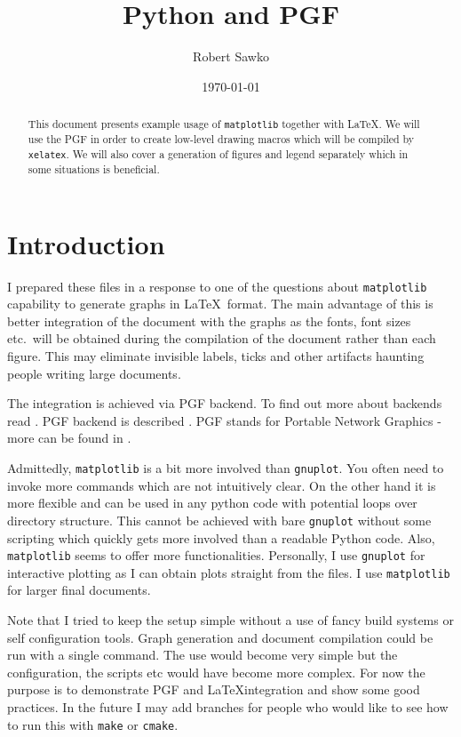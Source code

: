 \documentclass[a4paper,12pt]{article}
\date{\today}
\author{Robert Sawko}
\affil{Department of Engineering Computing, Cranfield University}
\title{Python and PGF}
\begin{document}
\maketitle

\begin{abstract}

  This document presents example usage of \texttt{matplotlib} together with
  \LaTeX. We will use the PGF in order to create low-level drawing macros which
  will be compiled by \texttt{xelatex}. We will also cover a generation of
  figures and legend separately which in some situations is beneficial.

\end{abstract}

\section{Introduction}

I prepared these files in a response to one of the questions about
\texttt{matplotlib} capability to generate graphs in \LaTeX\ format. The main
advantage of this is better integration of the document with the graphs as the
fonts, font sizes etc.\ will be obtained during the compilation of the document
rather than each figure. This may eliminate invisible labels, ticks and other
artifacts haunting people writing large documents.

The integration is achieved via PGF backend. To find out more about backends
read \cite{backend}. PGF backend is described \cite{pgf}. PGF stands for
Portable Network Graphics - more can be found in \cite{pgfwiki}.

Admittedly, \texttt{matplotlib} is a bit more involved than \texttt{gnuplot}.
You often need to invoke more commands which are not intuitively clear. On the
other hand it is more flexible and can be used in any python code with potential
loops over directory structure. This cannot be achieved with bare
\texttt{gnuplot} without some scripting which quickly gets more involved than a
readable Python code. Also, \texttt{matplotlib} seems to offer more
functionalities. Personally, I use \texttt{gnuplot} for interactive plotting as
I can obtain plots straight from the files. I use \texttt{matplotlib} for larger
final documents.

Note that I tried to keep the setup simple without a use of fancy build systems
or self configuration tools. Graph generation and document compilation could be
run with a single command. The use would become very simple but the
configuration, the scripts etc would have become more complex. For now the
purpose is to demonstrate PGF and \LaTeX integration and show some good
practices. In the future I may add branches for people who would like to see how
to run this with \texttt{make} or \texttt{cmake}.
\end{document}
